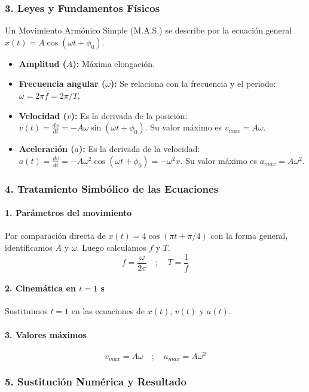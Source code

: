 \subsubsection*{3. Leyes y Fundamentos Físicos}
Un Movimiento Armónico Simple (M.A.S.) se describe por la ecuación general $x(t) = A\cos(\omega t + \phi_0)$.
\begin{itemize}
    \item \textbf{Amplitud ($A$):} Máxima elongación.
    \item \textbf{Frecuencia angular ($\omega$):} Se relaciona con la frecuencia y el periodo: $\omega = 2\pi f = 2\pi/T$.
    \item \textbf{Velocidad ($v$):} Es la derivada de la posición: $v(t) = \frac{dx}{dt} = -A\omega\sin(\omega t + \phi_0)$. Su valor máximo es $v_{max} = A\omega$.
    \item \textbf{Aceleración ($a$):} Es la derivada de la velocidad: $a(t) = \frac{dv}{dt} = -A\omega^2\cos(\omega t + \phi_0) = -\omega^2 x$. Su valor máximo es $a_{max} = A\omega^2$.
\end{itemize}

\subsubsection*{4. Tratamiento Simbólico de las Ecuaciones}
\paragraph{1. Parámetros del movimiento}
Por comparación directa de $x(t) = 4\cos(\pi t + \pi/4)$ con la forma general, identificamos $A$ y $\omega$. Luego calculamos $f$ y $T$.
$$f = \frac{\omega}{2\pi} \quad ; \quad T = \frac{1}{f}$$
\paragraph{2. Cinemática en $t=1$ s}
Sustituimos $t=1$ en las ecuaciones de $x(t)$, $v(t)$ y $a(t)$.
\paragraph{3. Valores máximos}
$$v_{max} = A\omega \quad ; \quad a_{max} = A\omega^2$$

\subsubsection*{5. Sustitución Numérica y Resultado}
